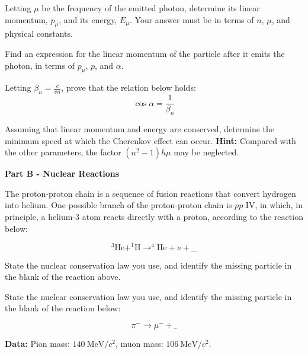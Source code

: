 \documentclass[11pt]{article}
\begin{document}
\begin{pproblem}
    \begin{alternativas}
        \item Letting $\mu$ be the frequency of the emitted photon, determine its linear
        momentum, $p_\mu$, and its energy, $E_\mu$. Your answer must be in terms of $n$, $\mu$, and physical constants.
        \item Find an expression for the linear momentum of the particle after it emits
    the photon, in terms of $p_\mu$, $p$, and $\alpha$.
        \item Letting $\beta_n = \frac{c}{vn}$, prove that the relation below holds:
        \begin{equation}
            \cos\alpha = \frac{1}{\beta_n}
        \end{equation}
        \item Assuming that linear momentum and energy are conserved, determine the
        minimum speed at which the Cherenkov effect can occur.
        \textbf{Hint:} Compared with the other parameters, the factor $(n^2-1)h\mu$ may be neglected.

    \begin{center}
        \textbf{Part B - Nuclear Reactions}    
    \end{center}
    
    The proton-proton chain is a sequence of fusion reactions that convert hydrogen into helium.
    One possible branch of the proton-proton chain is $pp \text{ IV}$, in which, in principle, a
    helium-3 atom reacts directly with a proton, according to the reaction below:

    \begin{equation}
        ^3\text{He} + ^1\text{H} \rightarrow ^4\text{He} + \nu + \_\_
    \end{equation}

        \item  State the nuclear conservation law you use, and identify the missing particle
        in the blank of the reaction above.

        \item  State the nuclear conservation law you use, and identify the missing particle
        in the blank of the reaction below:

        \begin{equation}
            \pi^- \rightarrow \mu^- + \_
        \end{equation}
        
        \textbf{Data:} Pion mass: $140 \ \text{MeV}/c^2$, muon mass: $106 \ \text{MeV}/c^2$.
    \end{alternativas}


\end{pproblem}
\end{document}
